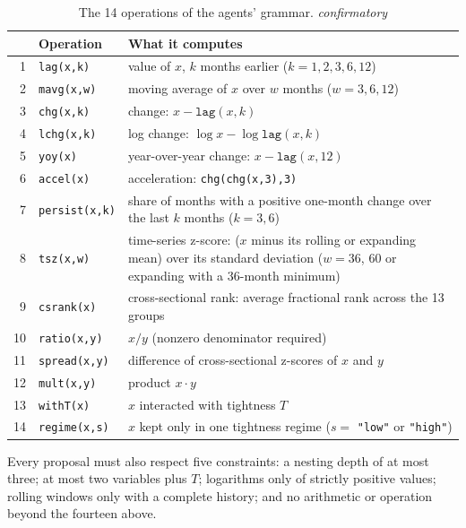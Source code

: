 \documentclass[11pt,letterpaper]{article}
\newcommand{\tagc}{{\footnotesize\itshape confirmatory}}
\begin{document}
\begin{table}[H]
\centering\footnotesize
\caption{The 14 operations of the agents' grammar. \hfill\tagc}
\label{tab:grammar}
\begin{tabularx}{\textwidth}{@{}r l X@{}}
\toprule
 & Operation & What it computes \\
\midrule
1  & \texttt{lag(x,k)}     & value of $x$, $k$ months earlier ($k=1,2,3,6,12$) \\
2  & \texttt{mavg(x,w)}    & moving average of $x$ over $w$ months ($w=3,6,12$) \\
3  & \texttt{chg(x,k)}     & change: $x - \texttt{lag}(x,k)$ \\
4  & \texttt{lchg(x,k)}    & log change: $\log x - \log \texttt{lag}(x,k)$ \\
5  & \texttt{yoy(x)}       & year-over-year change: $x - \texttt{lag}(x,12)$ \\
6  & \texttt{accel(x)}     & acceleration: \texttt{chg(chg(x,3),3)} \\
7  & \texttt{persist(x,k)} & share of months with a positive one-month change over the last $k$ months ($k=3,6$) \\
8  & \texttt{tsz(x,w)}     & time-series z-score: ($x$ minus its rolling or expanding mean) over its standard deviation ($w=36$, $60$ or expanding with a 36-month minimum) \\
9  & \texttt{csrank(x)}    & cross-sectional rank: average fractional rank across the 13 groups \\
10 & \texttt{ratio(x,y)}   & $x/y$ (nonzero denominator required) \\
11 & \texttt{spread(x,y)}  & difference of cross-sectional z-scores of $x$ and $y$ \\
12 & \texttt{mult(x,y)}    & product $x\cdot y$ \\
13 & \texttt{withT(x)}     & $x$ interacted with tightness $T$ \\
14 & \texttt{regime(x,s)}  & $x$ kept only in one tightness regime ($s=$ \texttt{"low"} or \texttt{"high"}) \\
\bottomrule
\end{tabularx}
\end{table}
Every proposal must also respect five constraints: a nesting depth of at most
three; at most two variables plus $T$; logarithms only of strictly positive
values; rolling windows only with a complete history; and no arithmetic or
operation beyond the fourteen above.
\end{document}
